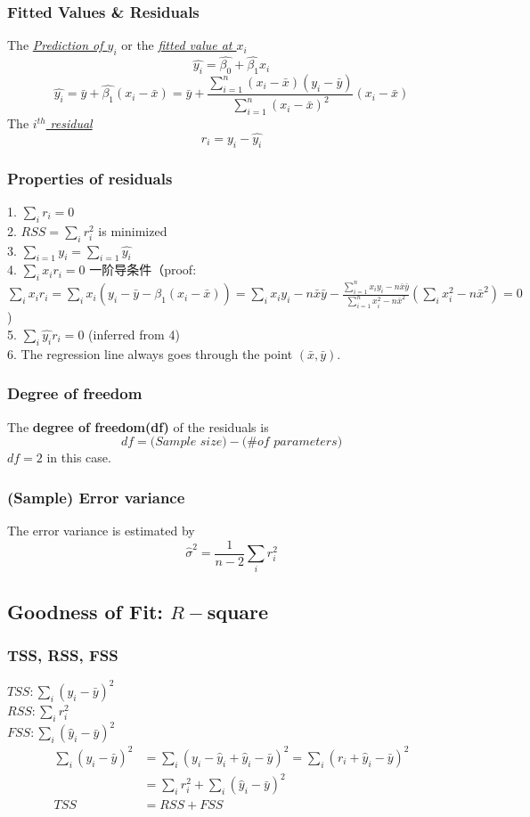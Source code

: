 \documentclass[11pt,a4paper]{article}
\begin{document}
\subsubsection{Fitted Values \& Residuals}
The \underline{\textit{Prediction of $y_i$}} or the \underline{\textit{fitted value at $x_i$}}
$$\hat{y_i}=\hat{\beta_0}+\hat{\beta_1}x_i$$
$$\hat{y_i}=\bar{y}+\hat{\beta_1}(x_i-\bar{x})=\bar{y}+\frac{\sum_{i=1}^{n}\left(x_{i}-\bar{x}\right)\left(y_{i}-\bar{y}\right)}{\sum_{i=1}^{n}\left(x_{i}-\bar{x}\right)^{2}}(x_i-\bar{x})$$
The \underline{\textit{$i^{th}$ residual}}
$$r_i=y_i-\hat{y_i}$$

\subsubsection{Properties of residuals}
1. $\sum_i r_i=0$\\
2. $RSS=\sum_i r_i^2$ is minimized\\
3. $\sum_{i=1}y_i=\sum_{i=1}\hat{y_i}$\\
4. $\sum_ix_ir_i=0$ 一阶导条件（proof: $\sum_ix_ir_i=\sum_ix_i(y_i-\bar{y}-\hat{\beta_1}(x_i-\bar{x}))=\sum_ix_iy_i-n\bar{x}\bar{y}-\frac{\sum_{i=1}^{n} x_{i} y_{i}-n \bar{x} \bar{y}}{\sum_{i=1}^{n} x_{i}^{2}-n \bar{x}^{2}}(\sum_ix_i^2-n\bar{x}^2)=0$)\\
5. $\sum_i \hat{y_i} r_i=0$ (inferred from 4)\\
6. The regression line always goes through the point $(\bar{x},\bar{y})$.

\subsubsection{Degree of freedom}
The \textbf{degree of freedom(df)} of the residuals is
$$df=\textit{(Sample size)}-\textit{(\# of parameters)}$$
$df=2$ in this case.

\subsubsection{(Sample) Error variance}
The error variance is estimated by$$\hat{\sigma}^2=\frac{1}{n-2}\sum_i r_i^2$$

\subsection{Goodness of Fit: $R-$square}
\subsubsection{TSS, RSS, FSS}
$TSS: \sum_i(y_i-\bar{y})^2$\\
$RSS: \sum_ir_i^2$\\
$FSS: \sum_i(\hat{y}_i-\bar{y})^2$
$$\begin{aligned}
    \sum_{i}\left(y_{i}-\bar{y}\right)^{2} &=\sum_{i}\left(y_{i}-\hat{y}_{i}+\hat{y}_{i}-\bar{y}\right)^{2}=\sum_{i}\left(r_{i}+\hat{y}_{i}-\bar{y}\right)^{2} \\
    &=\sum_{i} r_{i}^{2}+\sum_{i}\left(\hat{y}_{i}-\bar{y}\right)^{2} \\
    T S S &=R S S+F S S
    \end{aligned}$$
\end{document}
